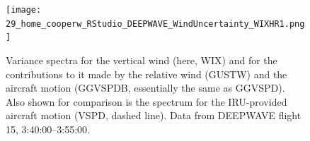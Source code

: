 \documentclass[12pt,twoside,english]{article}\usepackage[]{graphicx}\usepackage[]{color}
\let\OrgIndex\index
\renewcommand*{\index}[1]{\OrgIndex{#1}}
\begin{document}

\begin{figure}
\noindent \begin{centering}
\texttt{[image: 29\_home\_cooperw\_RStudio\_DEEPWAVE\_WindUncertainty\_WIXHR1.png]}  
\par\end{centering}

\protect\caption[Variance spectra for the vertical wind and for the contributions made by the relative wind and the aircraft motion.]{\label{fig:WIXHR1}Variance spectra for the vertical wind (here, WIX) and for the contributions to it made by the relative wind (GUSTW) and the aircraft motion (GGVSPDB, essentially the same as GGVSPD). Also shown for comparison is the spectrum for the IRU-provided aircraft motion (VSPD, dashed line). Data from DEEPWAVE flight 15, 3:40:00--3:55:00.} 
\end{figure}
\end{document}
